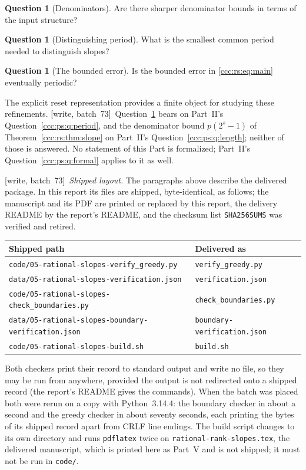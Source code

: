 \documentclass[11pt,letterpaper]{article}
\theoremstyle{definition}
\newtheorem{question}[theorem]{Question}
\theoremstyle{remark}
\newcommand{\wsevthree}{\textup{[write, batch~73]}}
\begin{document}
\begin{question}[Denominators]\label{ccc:rs:q:denominator}
Are there sharper denominator bounds in terms of the input structure?
\end{question}

\begin{question}[Distinguishing period]\label{ccc:rs:q:period}
What is the smallest common period needed to distinguish slopes?
\end{question}

\begin{question}[The bounded error]\label{ccc:rs:q:error}
Is the bounded error in \eqref{ccc:rs:eq:main} eventually periodic?
\end{question}

The explicit reset representation provides a finite object for studying these refinements.
\wsevthree\ Question~\ref{ccc:rs:q:period} bears on Part~II's
Question~\ref{ccc:ps:q:period}, and the denominator bound $p(2^s-1)$ of
Theorem~\ref{ccc:rs:thm:slope} on Part~II's Question~\ref{ccc:ps:q:length};
neither of those is answered. No statement of this Part is formalized; Part~II's
Question~\ref{ccc:ps:q:formal} applies to it as well.

\wsevthree\ \emph{Shipped layout.} The paragraphs above describe the delivered
package. In this report its files are shipped, byte-identical, as follows;
the manuscript and its PDF are printed or replaced by this report, the
delivery README by the report's README, and the checksum list
\texttt{SHA256SUMS} was verified and retired.
\begin{center}\footnotesize
\begin{tabular}{@{}P{.62\textwidth}P{.32\textwidth}@{}}
\toprule
\textbf{Shipped path} & \textbf{Delivered as}\\
\midrule
\nolinkurl{code/05-rational-slopes-verify_greedy.py} & \texttt{verify\_greedy.py}\\
\nolinkurl{data/05-rational-slopes-verification.json} & \texttt{verification.json}\\
\nolinkurl{code/05-rational-slopes-check_boundaries.py} & \texttt{check\_boundaries.py}\\
\nolinkurl{data/05-rational-slopes-boundary-verification.json} & \texttt{boundary-verification.json}\\
\nolinkurl{code/05-rational-slopes-build.sh} & \texttt{build.sh}\\
\bottomrule
\end{tabular}
\end{center}
Both checkers print their record to standard output and write no file, so
they may be run from anywhere, provided the output is not redirected onto a
shipped record (the report's README gives the commands). When the batch was
placed both were rerun on a copy with Python~3.14.4: the boundary checker in
about a second and the greedy checker in about seventy seconds, each printing
the bytes of its shipped record apart from CRLF line endings. The build
script changes to its own directory and runs \texttt{pdflatex} twice on
\texttt{rational-rank-slopes.tex}, the delivered manuscript, which is printed
here as Part~V and is not shipped; it must not be run in \texttt{code/}.
\end{document}
